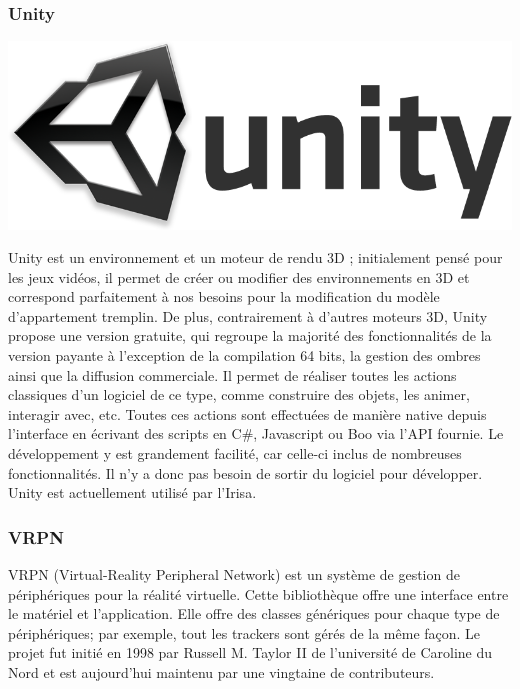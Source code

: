 	\subsubsection{Unity}
		\noindent\begin{minipage}{0.2\textwidth}
			\includegraphics[width=\linewidth]{1-PreEtude/img/unity_logo}
			\end{minipage}
			\hfill
			\begin{minipage}{0.8\textwidth}
			Unity\cite{unity} est un environnement et un moteur de rendu 3D ; initialement pensé pour les jeux vidéos, il permet de créer ou modifier des environnements en 3D et correspond parfaitement à nos besoins pour la modification du modèle d'appartement tremplin.
			De plus, contrairement à d'autres moteurs 3D, Unity propose une version gratuite, qui regroupe la majorité des fonctionnalités de la version payante à l'exception de la compilation 64 bits, la gestion des ombres ainsi que la diffusion commerciale.
			Il permet de réaliser toutes les actions classiques d'un logiciel de ce type, comme construire des objets, les animer, interagir avec, etc. Toutes ces actions sont effectuées de manière native depuis l'interface en écrivant des scripts en C\#, Javascript ou Boo via l'API fournie.
			Le développement y est grandement facilité, car celle-ci inclus de nombreuses fonctionnalités. Il n'y a donc pas besoin de sortir du logiciel pour développer.
			Unity est actuellement utilisé par l'Irisa.
		\end{minipage}


	\subsubsection{VRPN}

		VRPN\cite{vrpn} (Virtual-Reality Peripheral Network) est un système de gestion de périphériques pour la réalité virtuelle. Cette bibliothèque offre une interface entre le matériel et l'application. Elle offre des classes génériques pour chaque type de périphériques; par exemple, tout les trackers sont gérés de la même façon.
		Le projet fut initié en 1998 par Russell M. Taylor II de l'université de Caroline du Nord et est aujourd'hui maintenu par une vingtaine de contributeurs.

